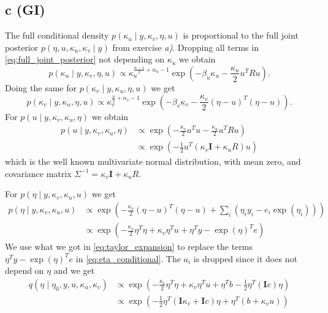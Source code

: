 \documentclass[a4paper]{article}\usepackage[]{graphicx}\usepackage[]{color}
\begin{document}
\subsection*{c (GI)}
The full conditional density $p(\kappa_u \mid y, \kappa_v, \eta, u)$ is proportional to the full joint posterior $p(\eta, u, \kappa_u, \kappa_v \mid y)$ from exercise \emph{a)}. Dropping all terms in \eqref{eq:full_joint_posterior} not depending on $\kappa_u$ we obtain
\begin{equation}
p(\kappa_u \mid y, \kappa_v, \eta, u) \propto
\kappa_u^{\frac{n-1}{2} + \alpha_u - 1}
\exp\left(-\beta_u\kappa_u
- \frac{\kappa_u}{2}u^TRu
\right).
\end{equation}
Doing the same for $p(\kappa_v \mid y, \kappa_u, \eta, u)$ we get
\begin{equation}
p(\kappa_v \mid y, \kappa_u, \eta, u) \propto 
\kappa_v^{\frac{n}{2} + \alpha_v - 1}
\exp\left(- \beta_v\kappa_v 
- \frac{\kappa_v}{2}\left(\eta - u\right)^T\left(\eta - u\right)
\right).
\end{equation}
For $p(u \mid y, \kappa_v, \kappa_u, \eta)$ we obtain
\begin{equation}
\begin{aligned}
p(u \mid y, \kappa_v, \kappa_u, \eta) & \propto
\exp\left(
- \frac{\kappa_v}{2}u^Tu
- \frac{\kappa_u}{2}u^TRu
\right) \\
& \propto
\exp\left(-\frac{1}{2} u^T \left(
\kappa_v \mathbf{I} +
\kappa_u R \right)
u
\right)
\end{aligned}
\end{equation}
which is the well known multivariate normal distribution, with mean zero, and covariance matrix $\Sigma^{-1} = \kappa_v \mathbf{I} + \kappa_u R$.

For $p(\eta \mid y, \kappa_v, \kappa_u, u)$ we get
\begin{equation}
\begin{aligned}
p(\eta \mid y, \kappa_v, \kappa_u, u) & \propto
\exp\left(
- \frac{\kappa_v}{2}\left(\eta - u\right)^T\left(\eta - u\right)
+ \sum_i \left( \eta_i y_i - e_i \exp(\eta_i)\right)
\right) \\
& \propto
\exp\left(
- \frac{\kappa_v}{2}\eta^T\eta + \kappa_v \eta^T u
+ \eta^T y - \exp(\eta)^T e
\right)
\end{aligned}
\label{eq:eta_conditional}
\end{equation}
We use what we got in \eqref{eq:taylor_expansion} to replace the terms $\eta^T y - \exp(\eta)^T e$ in \eqref{eq:eta_conditional}. The $a_i$ is dropped since it does not depend on $\eta$ and we get
\begin{equation}
\begin{aligned}
q(\eta \mid \eta_0, y, u, \kappa_u, \kappa_v)
& \propto \exp\left(-\frac{\kappa_v}{2}\eta^T\eta + \kappa_v \eta^Tu + \eta^T b - \frac{1}{2} \eta^T(\mathbf{I}c)\eta\right) \\
& \propto \exp\left(-\frac{1}{2}\eta^T\left(\mathbf{I}\kappa_v + \mathbf{I}c\right)\eta + \eta^T(b + \kappa_v u)\right)
\end{aligned}
\label{eq:eta_conditional_approx}
\end{equation}
\end{document}
